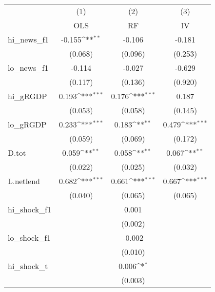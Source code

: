 {
\def\sym#1{\ifmmode^{#1}\else\(^{#1}\)\fi}
\begin{tabular}{l*{3}{c}}
\toprule
            &\multicolumn{1}{c}{(1)}&\multicolumn{1}{c}{(2)}&\multicolumn{1}{c}{(3)}\\
            &\multicolumn{1}{c}{OLS}&\multicolumn{1}{c}{RF}&\multicolumn{1}{c}{IV}\\
\midrule
hi\_news\_f1  &      -0.155\sym{**} &      -0.106         &      -0.181         \\
            &     (0.068)         &     (0.096)         &     (0.253)         \\
\addlinespace
lo\_news\_f1  &      -0.114         &      -0.027         &      -0.629         \\
            &     (0.117)         &     (0.136)         &     (0.920)         \\
\addlinespace
hi\_gRGDP    &       0.193\sym{***}&       0.176\sym{***}&       0.187         \\
            &     (0.053)         &     (0.058)         &     (0.145)         \\
\addlinespace
lo\_gRGDP    &       0.233\sym{***}&       0.183\sym{**} &       0.479\sym{***}\\
            &     (0.059)         &     (0.069)         &     (0.172)         \\
\addlinespace
D.tot       &       0.059\sym{**} &       0.058\sym{**} &       0.067\sym{**} \\
            &     (0.022)         &     (0.025)         &     (0.032)         \\
\addlinespace
L.netlend   &       0.682\sym{***}&       0.661\sym{***}&       0.667\sym{***}\\
            &     (0.040)         &     (0.065)         &     (0.065)         \\
\addlinespace
hi\_shock\_f1 &                     &       0.001         &                     \\
            &                     &     (0.002)         &                     \\
\addlinespace
lo\_shock\_f1 &                     &      -0.002         &                     \\
            &                     &     (0.010)         &                     \\
\addlinespace
hi\_shock\_t  &                     &       0.006\sym{*}  &                     \\
            &                     &     (0.003)         &                     \\

\end{tabular}}
